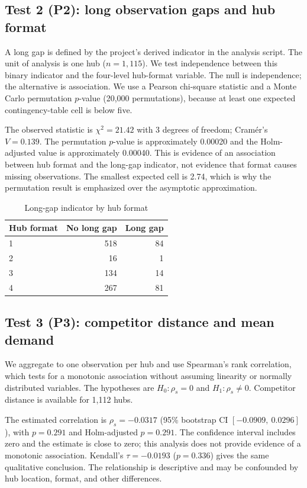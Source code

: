 \documentclass[10pt,a4paper,twocolumn]{article}
\begin{document}
\subsection{Test 2 (P2): long observation gaps and hub format}
A long gap is defined by the project's derived indicator in the analysis script. The unit of analysis is one hub ($n=1{,}115$). We test independence between this binary indicator and the four-level hub-format variable. The null is independence; the alternative is association. We use a Pearson chi-square statistic and a Monte Carlo permutation $p$-value (20,000 permutations), because at least one expected contingency-table cell is below five.

The observed statistic is $\chi^2=21.42$ with 3 degrees of freedom; Cram\'er's $V=0.139$. The permutation $p$-value is approximately 0.00020 and the Holm-adjusted value is approximately 0.00040. This is evidence of an association between hub format and the long-gap indicator, not evidence that format causes missing observations. The smallest expected cell is 2.74, which is why the permutation result is emphasized over the asymptotic approximation.

\begin{table}[t]
\centering
\caption{Long-gap indicator by hub format}
\label{tab:gaps}
\scriptsize
\begin{tabular}{lrr}
\toprule
Hub format & No long gap & Long gap\\
\midrule
1 & 518 & 84\\
2 & 16 & 1\\
3 & 134 & 14\\
4 & 267 & 81\\
\bottomrule
\end{tabular}
\end{table}

\subsection{Test 3 (P3): competitor distance and mean demand}
We aggregate to one observation per hub and use Spearman's rank correlation, which tests for a monotonic association without assuming linearity or normally distributed variables. The hypotheses are $H_0:\rho_s=0$ and $H_1:\rho_s\ne0$. Competitor distance is available for 1,112 hubs.

The estimated correlation is $\rho_s=-0.0317$ (95\% bootstrap CI $[-0.0909,\ 0.0296]$), with $p=0.291$ and Holm-adjusted $p=0.291$. The confidence interval includes zero and the estimate is close to zero; this analysis does not provide evidence of a monotonic association. Kendall's $\tau=-0.0193$ ($p=0.336$) gives the same qualitative conclusion. The relationship is descriptive and may be confounded by hub location, format, and other differences.
\end{document}
